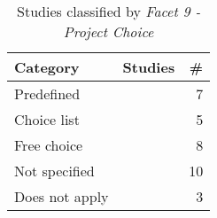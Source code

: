 
\begin{table}
	\centering
	\caption {Studies classified by \it Facet 9 - Project Choice}
		{\begin{tabular}{l|p{2.0in}|r}
			\bf Category & \bf Studies & \bf \#  \\
			\hline
			Predefined & \citep{id5353, id4503, id18433, id5329, id5335, id1192, id5147} & 7 \\
			Choice list & \citep{id0135, id1088, id4815, id5676, id17830} & 5 \\
			Free choice & \citep{id17882, id5343, id17796, id5357, id0093, id17845, id5546, id0098} & 8 \\
			Not specified & \citep{id4663, id0089, id0115, id17800, id0134, id0106, id1193, id4966, id18359, id5328} & 10 \\
			Does not apply & \citep{id4811, id17805, id1097} & 3 \\
		\end{tabular}}
	\label{tab:projectChoiceStudies}
\end{table}
